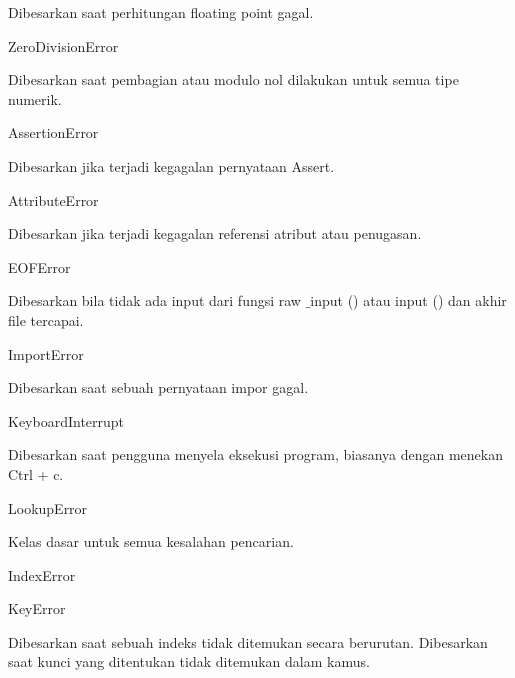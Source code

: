 Dibesarkan saat perhitungan floating point gagal. 
\vspace{12pt}

ZeroDivisionError \hspace*{0.5in}  

Dibesarkan saat pembagian atau modulo nol dilakukan untuk semua tipe numerik. 
\vspace{12pt}
\vspace{12pt}

AssertionError \hspace*{0.5in}  \hspace*{0.5in}  

Dibesarkan jika terjadi kegagalan pernyataan Assert. 
\vspace{12pt}

AttributeError \hspace*{0.5in}  \hspace*{0.5in}  
 
Dibesarkan jika terjadi kegagalan referensi atribut atau penugasan.
\vspace{12pt}

EOFError \hspace*{0.5in}  

Dibesarkan bila tidak ada input dari fungsi raw $  \_  $input () atau input () dan akhir file tercapai. 
\vspace{12pt}

ImportError \hspace*{0.5in}  \hspace*{0.5in}  

Dibesarkan saat sebuah pernyataan impor gagal. 
\vspace{12pt}

KeyboardInterrupt \hspace*{0.5in}  

Dibesarkan saat pengguna menyela eksekusi program, biasanya dengan menekan Ctrl + c. 
\vspace{12pt}

LookupError \hspace*{0.5in}  \hspace*{0.5in}  

Kelas dasar untuk semua kesalahan pencarian. 
\vspace{12pt}

IndexError 
 
KeyError \hspace*{0.5in}  \hspace*{0.5in}  
 
Dibesarkan saat sebuah indeks tidak ditemukan secara berurutan. Dibesarkan saat kunci yang ditentukan tidak ditemukan dalam kamus. 
\vspace{12pt}


